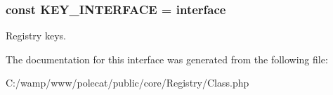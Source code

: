 \subsubsection[{K\+E\+Y\+\_\+\+I\+N\+T\+E\+R\+F\+A\+C\+E}]{\setlength{\rightskip}{0pt plus 5cm}const K\+E\+Y\+\_\+\+I\+N\+T\+E\+R\+F\+A\+C\+E = \textquotesingle{}interface\textquotesingle{}}\label{interface_able_polecat___registry___class_interface_ac0399ea0e4f58ad953bae088a1710c3c}
Registry keys. 

The documentation for this interface was generated from the following file\+:\begin{DoxyCompactItemize}
\item 
C\+:/wamp/www/polecat/public/core/\+Registry/Class.\+php\end{DoxyCompactItemize}
